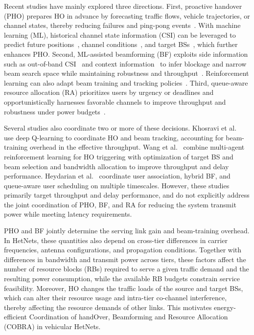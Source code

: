 \documentclass[10pt,journal,letterpaper]{IEEEtran}
\newcommand{\rev}[1]{\textcolor{revisioncolor}{{}#1}}
\newcommand{\omitted}[1]{}
\theoremstyle{remark}
\begin{document}
Recent studies \rev{have mainly explored}\omitted{} three directions.
First, proactive handover (PHO) prepares HO in advance by forecasting traffic flows, vehicle trajectories, or channel states, thereby reducing failures and ping-pong events~\cite{lee2020prediction,sun2018energy}. With machine learning (ML), historical channel state information (CSI) can be leveraged to predict future positions~\cite{AEPHORA2025ICC}, channel conditions~\cite{ryden2023}, and target BSs~\cite{park2024mobility}, which further enhances PHO.
Second, ML-assisted beamforming (BF) exploits side information such as out-of-band CSI~\cite{alrabeiah2020tcom} and context information~\cite{va2017inverse} to infer blockage and narrow beam search space while maintaining robustness and throughput~\cite{wang2024beam}. Reinforcement learning can also adapt beam training and tracking policies~\cite{xie2024TVT}.
Third, queue-aware resource allocation (RA) prioritizes users by urgency or deadlines and opportunistically harnesses favorable channels to improve throughput and robustness under power budgets~\cite{liu2022queueaware,zhang2019qosaware}. 

\omitted{}\rev{Several studies also coordinate two or more of these decisions.
Khosravi et al.~\cite{khosravi2023joint} use deep Q-learning to coordinate HO and beam tracking, accounting for beam-training overhead in the effective throughput.
Wang et al.~\cite{wang2024joint} combine multi-agent reinforcement learning for HO triggering with optimization of target BS and beam selection and bandwidth allocation to improve throughput and delay performance.
Heydarian et al.~\cite{heydarian2025multitimescale} coordinate user association, hybrid BF, and queue-aware user scheduling on multiple timescales. 
However, these studies primarily target throughput and delay performance, and do not explicitly address the joint coordination of PHO, BF, and RA for reducing the system transmit power while meeting latency requirements.}

\omitted{}\omitted{}\rev{PHO and BF jointly determine the serving link gain and beam-training overhead.
In HetNets, these quantities also depend on cross-tier differences in carrier frequencies, antenna configurations, and propagation conditions.
Together with differences in bandwidth and transmit power across tiers, these factors affect the number of resource blocks (RBs) required to serve a given traffic demand and the resulting power consumption, while the available RB budgets constrain service feasibility.}
\rev{Moreover, HO changes the traffic loads of the source and target BSs, which can alter their resource usage and intra-tier co-channel interference, thereby affecting the resource demands of other links.}
\omitted{}\rev{This motivates energy-efficient {C}oordination of hand{O}ver, {B}eamforming and {R}esource {A}llocation (COBRA) in vehicular HetNets.}
\end{document}
